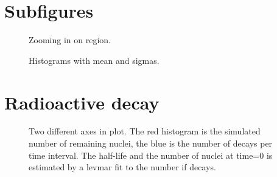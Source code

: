 \documentclass{article}
\begin{document}
\section{Subfigures}
\label{sec:subfig}

\begin{figure}[H]
  \centering
  
  \caption{ Zooming in on region. }
\end{figure}

\begin{figure}[H]
  \centering
  
  \caption{ Histograms with mean and sigmas.}
\end{figure}

\section{Radioactive decay}
\label{sec:decay}

\begin{figure}[H]
  \centering
  
  \caption{ Two different axes in plot. The red histogram is the simulated number of
    remaining nuclei, the blue is the number of decays per time interval. The half-life and
    the number of nuclei at time=0 is estimated by a levmar fit to the number if decays.}
\end{figure}
\end{document}
